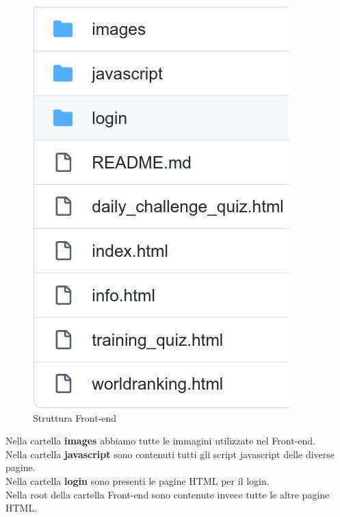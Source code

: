 \begin{figure}[!h]
\centering
\includegraphics[scale=0.3]{images/struttura_front-end.jpg}
\caption{Struttura Front-end }
\label{fig:struttura_front-end}
\end{figure}
\noindent
Nella cartella \textbf{images} abbiamo tutte le immagini utilizzate nel Front-end. \\
Nella cartella \textbf{javascript} sono contenuti tutti gli script javascript delle diverse pagine. \\
Nella cartella \textbf{login} sono presenti le pagine HTML per il login. \\
Nella root della cartella Front-end sono contenute invece tutte le altre pagine HTML.

